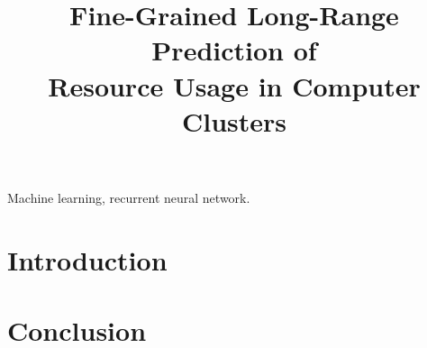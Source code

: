 \documentclass[journal]{IEEEtran}
\title{
  Fine-Grained Long-Range Prediction of\\
  Resource Usage in Computer Clusters
}
\author{}
\begin{document}
  \maketitle

  \begin{abstract}
    
  \end{abstract}

  \begin{IEEEkeywords}
    Machine learning,
    recurrent neural network.
  \end{IEEEkeywords}


  \section{Introduction} 
  

  \section{Conclusion} 
  

  
  
\end{document}
